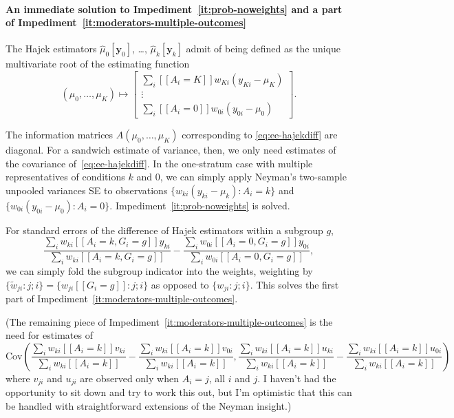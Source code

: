 \paragraph*{An immediate solution to
  Impediment~\ref{it:prob-noweights} and a part of Impediment~\ref{it:moderators-multiple-outcomes}}

The Hajek estimators $\hat{\mu}_{0}[\mathbf{y}_{0}]$, \ldots,
$\hat{\mu}_{k}[\mathbf{y}_{k}]$ admit of being defined as the unique
multivariate root of the estimating function
\begin{equation} \label{eq:ee-hajekdiff}
(\mu_{0}, \ldots, \mu_{K}) \mapsto
  \left[
\begin{array}{c}
\sum_i [\![A_i=K]\!] w_{Ki} (y_{Ki} - \mu_K) \\
\vdots \\
\sum_i [\![A_i=0]\!] w_{0i} (y_{0i} - \mu_0)
\end{array}
\right]
.
\end{equation}

The information matrices $A(\mu_0, \ldots, \mu_K)$ corresponding to
\eqref{eq:ee-hajekdiff} are diagonal.  For a sandwich estimate of
variance, then, we only need estimates of the covariance
of~\eqref{eq:ee-hajekdiff}.  In the one-stratum case with multiple
representatives of conditions $k$ and $0$, we can simply apply
Neyman's two-sample unpooled variances SE to observations $\{ w_{ki}
(y_{ki} - \mu_k) : A_i = k\}$ and $\{ w_{0i} (y_{0i} - \mu_0) : A_i =
0\}$.  Impediment~\ref{it:prob-noweights} is solved.

For standard errors of the difference of Hajek estimators within a
subgroup $g$,
\begin{equation*}
 \frac{\sum_i w_{ki} [\![A_i=k, G_{i} =g]\!] y_{ki}}{\sum_i w_{ki}
     [\![A_i=k, G_{i}=g]\!]}
 -
  \frac{\sum_i w_{0i} [\![A_i=0, G_{i} =g]\!] y_{0i}}{\sum_i w_{0i}
     [\![A_i=0, G_{i}=g]\!]},
\end{equation*}
we can simply fold the subgroup indicator into the weights,
weighting by $\{\tilde{w}_{ji}:j; i\} = \{w_{ji}[\![G_{i}=g]\!]: j; i\}$ as opposed to $\{w_{ji}:j;
i\}$. This solves the first part of
Impediment~\ref{it:moderators-multiple-outcomes}.

(The remaining piece of Impediment~\ref{it:moderators-multiple-outcomes}
is the need for estimates of
\begin{equation*}
  \mathrm{Cov}\left(
    \frac{\sum_i w_{ki} [\![A_i=k]\!] v_{ki}}{\sum_i w_{ki}
      [\![A_i=k]\!]} -
    \frac{\sum_i w_{ki} [\![A_i=k]\!] v_{0i}}{\sum_i w_{ki}  [\![A_i=k]\!]},
  \frac{\sum_i {w}_{ki} [\![A_i=k]\!] u_{ki}}{\sum_i {w}_{ki}
      [\![A_i=k]\!]} -
    \frac{\sum_i {w}_{ki} [\![A_i=k]\!] u_{0i}}{\sum_i {w}_{ki}  [\![A_i=k]\!]}
  \right)
\end{equation*}
where $v_{ji}$ and $u_{ji}$ are observed only
when $A_{i}=j$, all $i$ and $j$.   I haven't had the opportunity to
sit down and try to work this out, but I'm optimistic that this
can be handled with straightforward extensions of the Neyman insight.)


